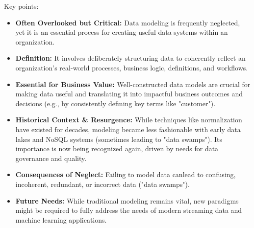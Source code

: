 Key points:
\begin{itemize}
    \item \textbf{Often Overlooked but Critical:}
    Data modeling is frequently neglected, yet it is an
    essential process for creating useful data systems within
    an organization.

    \item \textbf{Definition:} It involves deliberately
    structuring data to coherently reflect an organization's
    real-world processes, business logic, definitions, and
    workflows.

    \item \textbf{Essential for Business Value:} Well-constructed
    data models are crucial for making data useful and translating
    it into impactful business outcomes and decisions (e.g., by
    consistently defining key terms like "customer").

    \item \textbf{Historical Context \& Resurgence:} While
    techniques like normalization have existed for decades,
    modeling became less fashionable with early data lakes and NoSQL
    systems (sometimes leading to "data swamps"). Its importance is
    now being recognized again, driven by needs for data governance
    and quality.

    \item \textbf{Consequences of Neglect:} Failing to model data
    canlead to confusing, incoherent, redundant, or incorrect
    data ("data swamps").

    \item \textbf{Future Needs:} While
    traditional modeling remains vital, new paradigms might be
    required to fully address the needs of modern streaming data
    and machine learning applications.
\end{itemize}




